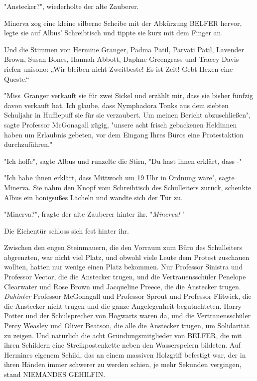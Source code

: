 {"Anstecker?", wiederholte der alte Zauberer.

Minerva zog eine kleine silberne Scheibe mit der Abkürzung BELFER hervor, legte sie auf Albus' Schreibtisch und tippte sie kurz mit dem Finger an.

Und die Stimmen von Hermine Granger, Padma Patil, Parvati Patil, Lavender Brown, Susan Bones, Hannah Abbott, Daphne Greengrass und Tracey Davis riefen unisono: „Wir bleiben nicht Zweitbeste! Es ist Zeit! Gebt Hexen eine Queste.“

"Miss~Granger verkauft sie für zwei Sickel und erzählt mir, dass sie bisher fünfzig davon verkauft hat. Ich glaube, dass Nymphadora Tonks aus dem siebten Schuljahr in Hufflepuff sie für sie verzaubert. Um meinen Bericht abzuschließen", sagte Professor McGonagall zügig, "unsere acht frisch gebackenen Heldinnen haben um Erlaubnis gebeten, vor dem Eingang Ihres Büros eine Protestaktion durchzuführen."

"Ich hoffe", sagte Albus und runzelte die Stirn, "Du hast ihnen erklärt, dass -"

"Ich habe ihnen erklärt, dass Mittwoch um 19 Uhr in Ordnung wäre", sagte Minerva. Sie nahm den Knopf vom Schreibtisch des Schulleiters zurück, schenkte Albus ein honigsüßes Lächeln und wandte sich der Tür zu.

"Minerva?", fragte der alte Zauberer hinter ihr. "\emph{Minerva!} "

Die Eichentür schloss sich fest hinter ihr.

Zwischen den engen Steinmauern, die den Vorraum zum Büro des Schulleiters abgrenzten, war nicht viel Platz, und obwohl viele Leute dem Protest zuschauen wollten, hatten nur wenige einen Platz bekommen. Nur Professor Sinistra und Professor Vector, die die Anstecker trugen, und die Vertrauensschüler Penelope Clearwater und Rose Brown und Jacqueline Preece, die die Anstecker trugen. \emph{Dahinter} Professor McGonagall und Professor Sprout und Professor Flitwick, die die Anstecker nicht trugen und die ganze Angelegenheit begutachteten. Harry Potter und der Schulsprecher von Hogwarts waren da, und die Vertrauensschüler Percy Weasley und Oliver Beatson, die alle die Anstecker trugen, um Solidarität zu zeigen. Und natürlich die acht Gründungsmitglieder von BELFER, die mit ihren Schildern eine Streikpostenkette neben den Wasserspeiern bildeten. Auf Hermines eigenem Schild, das an einem massiven Holzgriff befestigt war, der in ihren Händen immer schwerer zu werden schien, je mehr Sekunden vergingen, stand NIEMANDES GEHILFIN.

}
